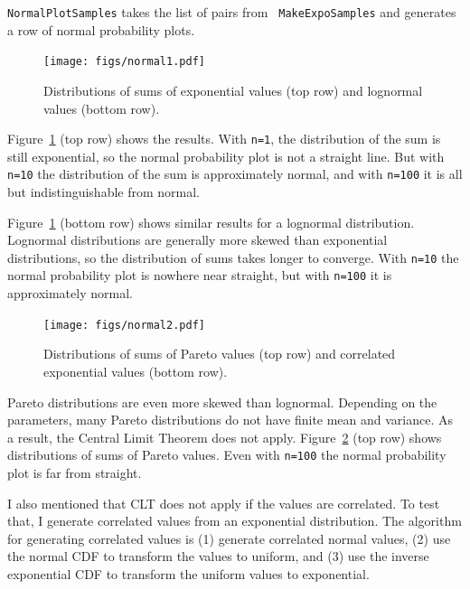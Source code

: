 \documentclass[12pt]{book}
\theoremstyle{exercise}
\begin{document}
{\tt NormalPlotSamples} takes the list of pairs from {\tt
  MakeExpoSamples} and generates a row of normal probability plots.%

\begin{figure}
\centerline{\texttt{[image: figs/normal1.pdf]}}
\caption{Distributions of sums of exponential values (top row) and
lognormal values (bottom row).}%
\label{normal1}
\end{figure}

Figure~\ref{normal1} (top row) shows
the results.  With {\tt n=1}, the distribution of the sum is still
exponential, so the normal probability plot is not a straight line.
But with {\tt n=10} the distribution of the sum is approximately
normal, and with {\tt n=100} it is all but indistinguishable from
normal.

Figure~\ref{normal1} (bottom row) shows similar results for a
lognormal distribution.  Lognormal distributions are generally more
skewed than exponential distributions, so the distribution of sums
takes longer to converge.  With {\tt n=10} the normal
probability plot is nowhere near straight, but with {\tt n=100}
it is approximately normal.%
%
%

\begin{figure}
\centerline{\texttt{[image: figs/normal2.pdf]}}
\caption{Distributions of sums of Pareto values (top row) and
correlated exponential values (bottom row).}%
\label{normal2}
\end{figure}

Pareto distributions are even more skewed than lognormal.  Depending
on the parameters, many Pareto distributions do not have finite mean
and variance.  As a result, the Central Limit Theorem does not apply.
Figure~\ref{normal2} (top row) shows distributions of sums of
Pareto values.  Even with {\tt n=100} the normal probability plot
is far from straight.%
%
%
%
%

I also mentioned that CLT does not apply if the values are correlated.
To test that, I generate correlated values from an exponential
distribution.  The algorithm for generating correlated values is
(1) generate correlated normal values, (2) use the normal CDF
to transform the values to uniform, and (3) use the inverse
exponential CDF to transform the uniform values to exponential.%
%
%
%
\end{document}
